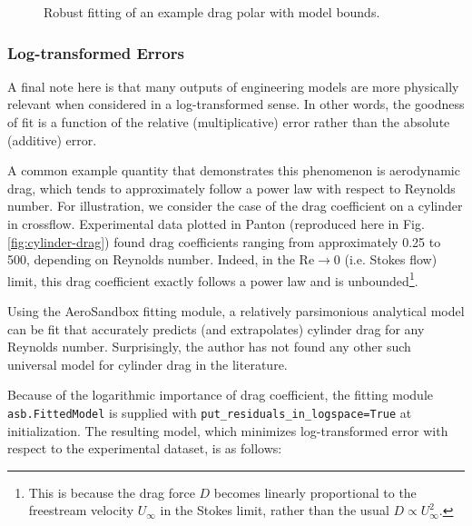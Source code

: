 \begin{figure}[H]
    \centering
%    
    \ifdraft{}{}
    \caption{Robust fitting of an example drag polar with model bounds.}
    \label{fig:constrained-fitting}
\end{figure}

\subsubsection{Log-transformed Errors}

A final note here is that many outputs of engineering models are more physically relevant when considered in a log-transformed sense. In other words, the goodness of fit is a function of the relative (multiplicative) error rather than the absolute (additive) error.

A common example quantity that demonstrates this phenomenon is aerodynamic drag, which tends to approximately follow a power law with respect to Reynolds number. For illustration, we consider the case of the drag coefficient on a cylinder in crossflow. Experimental data plotted in Panton \cite{Panton} (reproduced here in Fig. \ref{fig:cylinder-drag}) found drag coefficients ranging from approximately 0.25 to 500, depending on Reynolds number. Indeed, in the $\text{Re} \to 0$ (i.e. Stokes flow) limit, this drag coefficient exactly follows a power law and is unbounded\footnote{This is because the drag force $D$ becomes linearly proportional to the freestream velocity $U_\infty$ in the Stokes limit, rather than the usual $D \propto U_\infty^2$.}.

Using the AeroSandbox fitting module, a relatively parsimonious analytical model can be fit that accurately predicts (and extrapolates) cylinder drag for any Reynolds number. Surprisingly, the author has not found any other such universal model for cylinder drag in the literature.

Because of the logarithmic importance of drag coefficient, the fitting module \texttt{asb.FittedModel} is supplied with \texttt{put_residuals_in_logspace=True} at initialization. The resulting model, which minimizes log-transformed error with respect to the experimental dataset, is as follows:

\newcommand{\logt}{\log_{10}}
\newcommand{\logtr}{\logt(\text{Re})}

